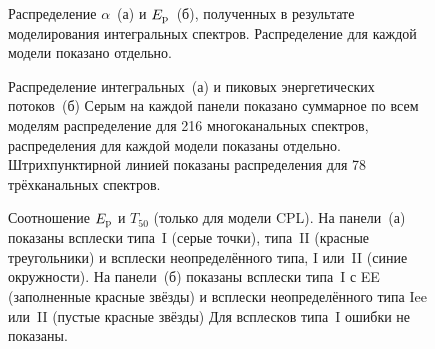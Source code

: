 \begin{figure}
	\begin{minipage}[h]{0.5\textwidth}
    \end{minipage}
    \hfill
    \begin{minipage}[h]{0.5\textwidth}
	\end{minipage}
    \caption{
    Распределение $\alpha$~(а) и $E_{\mathrm{p}}$~(б), полученных 
    в результате моделирования интегральных спектров. Распределение для каждой модели
    показано отдельно.
    \label{fig:par_dist} }
\end{figure}


\begin{figure}
    \begin{minipage}[h]{0.5\textwidth}
    \end{minipage}
    \hfill
    \begin{minipage}[h]{0.5\textwidth}
	\end{minipage}
\caption{
    Распределение интегральных~(а) и пиковых энергетических потоков~(б)
    Серым на каждой панели показано суммарное по всем моделям распределение для 216
    многоканальных спектров, распределения для каждой модели показаны отдельно. 
    Штрихпунктирной линией показаны распределения для 78 трёхканальных спектров.
    \label{fig:fl_pf_dist} }
\end{figure}

\begin{figure}
    \begin{minipage}[h]{0.5\textwidth}
    \end{minipage}
    \hfill
    \begin{minipage}[h]{0.5\textwidth}
	\end{minipage}

\caption{
    Соотношение $E_{\mathrm{p}}$ и $T_{50}$ (только для модели CPL).
    На панели~(а) показаны всплески типа~I (серые точки), типа~II (красные треугольники)
    и всплески неопределённого типа, I или~II (синие окружности).
    На панели~(б) показаны всплески типа~I с EE (заполненные красные звёзды)
    и всплески неопределённого типа Iee или~II (пустые красные звёзды)
    Для всплесков типа~I ошибки не показаны. 
    \label{fig:EpT50}}
\end{figure}

